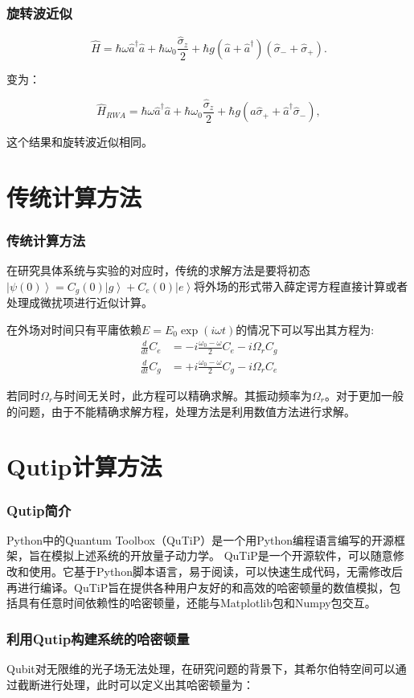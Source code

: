 \documentclass[aspectratio=169, 12pt]{beamer}
\begin{document}
\begin{frame}
    \frametitle{旋转波近似}
    \begin{equation}
        \hat{H}=\hbar \omega \hat{a}^{\dagger} \hat{a}+\hbar \omega_{0} \frac{\hat{\sigma}_{z}}{2}+\hbar g\left(\hat{a} +\hat{a}^{\dagger} \right)\left(\hat{\sigma}_{-}+\hat{\sigma}_{+}\right).
    \end{equation}

    变为：

    \begin{equation}
        \hat{H}_{RWA}=\hbar \omega \hat{a}^{\dagger} \hat{a}+\hbar \omega_{0} \frac{\hat{\sigma}_{z}}{2}+\hbar g\left(\hat{a}\hat{\sigma}_{+} +\hat{a}^{\dagger}\hat{\sigma}_{-} \right),
        \label{equ:H-RWA}
    \end{equation}

    这个结果和旋转波近似\cite{wu_strong-coupling_2007}相同。

\end{frame}

\section{传统计算方法}
\begin{frame}[shrink]
    \frametitle{传统计算方法}
    在研究具体系统与实验的对应时，传统的求解方法是要将初态$\left|\psi(0)\right> = C_g(0)\left|g\right> + C_e(0)\left|e\right>$将外场的形式带入薛定谔方程直接计算或者处理成微扰项进行近似计算。

    在外场对时间只有平庸依赖$E = E_0 \exp(i\omega t)$的情况下可以写出其方程为:
    \begin{equation}
        \begin{aligned}
            \frac{d}{d t} C_{e} & =-i \frac{\omega_{0}-\omega}{2} C_{e}-i \Omega_{r} C_{g} \\
            \frac{d}{d t} C_{g} & =+i \frac{\omega_{0}-\omega}{2} C_{g}-i \Omega_{r} C_{e}
        \end{aligned}
    \end{equation}

    若同时$\Omega_r$与时间无关时，此方程可以精确求解。其振动频率为$\Omega_r$。对于更加一般的问题，由于不能精确求解方程，处理方法是利用数值方法进行求解。

\end{frame}
\section{Qutip计算方法}
\begin{frame}
    \frametitle{Qutip简介}
    Python中的Quantum Toolbox（QuTiP）是一个用Python编程语言编写的开源框架\cite{johansson_qutip_2012}\cite{johansson_qutip_2013}，旨在模拟上述系统的开放量子动力学。
    QuTiP是一个开源软件，可以随意修改和使用。它基于Python脚本语言，易于阅读，可以快速生成代码，无需修改后再进行编译。QuTiP旨在提供各种用户友好的和高效的哈密顿量的数值模拟，包括具有任意时间依赖性的哈密顿量，还能与Matplotlib包和Numpy包交互。

\end{frame}

\begin{frame}
    \frametitle{利用Qutip构建系统的哈密顿量}
    Qubit对无限维的光子场无法处理，在研究问题的背景下，其希尔伯特空间可以通过截断进行处理，此时可以定义出其哈密顿量为：
    
\end{frame}
\end{document}
